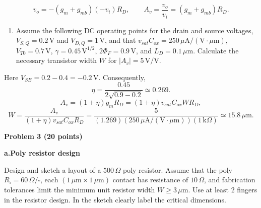 \[
v_o=-(g_m+g_{mb})(-v_i)R_D,
\qquad\boxed{A_v=\frac{v_o}{v_i}=(g_m+g_{mb})R_D.}
\]
\vspace{.15in}
\begin{enumerate}[label=\alph*.,start=2,leftmargin=.23in,topsep=0pt]
\item Assume the following DC operating points for the drain and source voltages,
$V_{S,Q}=0.2\,\mathrm V$ and $V_{D,Q}=1\,\mathrm V$, and that
$v_{sat}C_{ox}=250\,\mu\mathrm A/(\mathrm V\cdot\mu\mathrm m)$,
$V_{T0}=0.7\,\mathrm V$, $\gamma=0.45\,\mathrm V^{1/2}$,
$2\Phi_F=0.9\,\mathrm V$, and $L_D=0.1\,\mu\mathrm m$.
Calculate the necessary transistor width $W$ for $|A_v|=5\,\mathrm{V/V}$.
\end{enumerate}
\solutionlabel
Here $V_{SB}=0.2-0.4=-0.2\,\mathrm V$. Consequently,
\[
\eta=\frac{0.45}{2\sqrt{0.9-0.2}}\simeq0.269.
\]
\[
A_v=(1+\eta)g_mR_D=(1+\eta)v_{sat}C_{ox}WR_D,
\]
\[
\boxed{W=\frac{A_v}{(1+\eta)v_{sat}C_{ox}R_D}
=\frac5{(1.269)(250\,\mu\mathrm A/(\mathrm V\cdot\mu\mathrm m))
             (1\,\mathrm{k}\Omega)}\simeq15.8\,\mu\mathrm m.}
\]
\newpage

\textbf{Problem 3 (20 points)}\par
\textbf{a.\quad Poly resistor design}\par
Design and sketch a layout of a $500\,\Omega$ poly resistor. Assume that the poly
$R_{\square}=60\,\Omega/\square$, each $(1\,\mu\mathrm m\times1\,\mu\mathrm m)$
contact has resistance of $10\,\Omega$, and fabrication tolerances limit the minimum
unit resistor width $W\ge3\,\mu\mathrm m$. Use at least 2 fingers in the resistor
design. In the sketch clearly label the critical dimensions.

